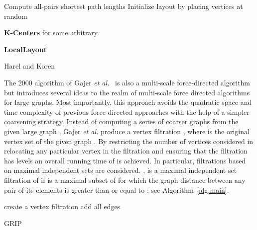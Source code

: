 \documentclass[notitlepage,letter,11pt]{article}
\begin{document}
\begin{algorithm}
Compute all-pairs shortest path lengths \;
Initialize layout  by placing vertices at random\;
\;
\Return{}\;

{\bf K-Centers}\;
 for some arbitrary \;
\Return{}\;

{\bf LocalLayout}\;
\caption{Harel and Koren\label{alg:HK}}
\end{algorithm}

The 2000 algorithm of Gajer {\em et al.}~\cite{ggk-afmda-00j} is also a multi-scale force-directed
algorithm but introduces several ideas to the realm of multi-scale
force directed algorithms for large graphs. Most importantly, this
approach avoids the quadratic space and time complexity of previous
force-directed approaches with the help of a simpler coarsening
strategy. Instead of computing a series of coarser graphs from the
given large graph , Gajer {\em et al.} produce a vertex
filtration , where  is the original vertex set of the given
graph . By restricting the number of vertices considered in
relocating any particular vertex in the filtration and ensuring that
the filtration has  levels an overall running time of
 is achieved. In particular, filtrations based on 
maximal independent sets are considered. , is a maximal independent set filtration of  if  is a maximal subset of  for which the
graph distance between any pair of its elements is greater than or
equal to ; see Algorithm~\ref{alg:main}.

\begin{algorithm}
create a vertex filtration \;
add all edges \;
\caption{GRIP \label{alg:main}}
\end{algorithm}
\end{document}
